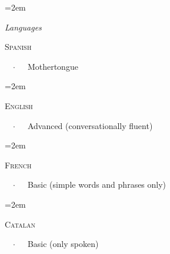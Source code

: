 \documentclass{scrartcl}
\newcommand{\Description}[1]{\hangindent=2em\hangafter=0\noindent\raggedright\footnotesize{#1}\par\normalsize\vspace{1em}} %
\newcommand{\header}[1]{{\small \textit{#1} \\ \vspace{0.2em}}}
\begin{document}
\begin{cv}{}
\Description{\header{Languages} \parbox{\langbox}{\textsc{Spanish}}\ \ $\cdotp$\ \ \ Mothertongue}

\vspace{-0.5em} %

\Description{\parbox{\langbox}{\textsc{English}}\ \ $\cdotp$\ \ \ Advanced (conversationally fluent)}

\vspace{-0.5em} %

\Description{\parbox{\langbox}{\textsc{French}}\ \ $\cdotp$\ \ \ Basic (simple words and phrases only)}
\vspace{-0.5em} %

\Description{\parbox{\langbox}{\textsc{Catalan}}\ \ $\cdotp$\ \ \ Basic (only spoken)}

\vspace{1em} %


\end{cv}
\end{document}
